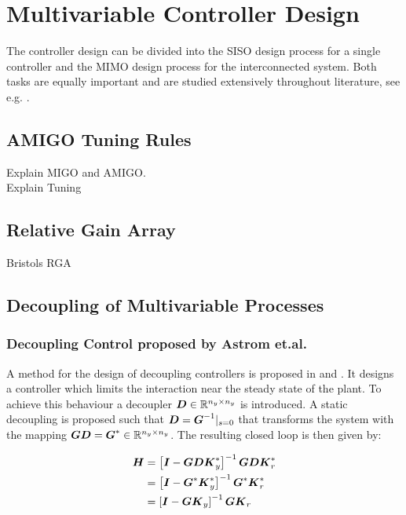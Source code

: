 \chapter{Multivariable Controller Design}%
\label{c:controller}

The controller design can be divided into the SISO design process for a single controller and the MIMO design process for the interconnected system. Both tasks are equally important and are studied extensively throughout literature, see e.g. \cite{Astrom2000a}.\\

\section{AMIGO Tuning Rules} %
\label{c:controller:s:AMIGO}

Explain MIGO and AMIGO.\\
Explain Tuning

\section{Relative Gain Array} %
\label{c:control:s:rga}

Bristols RGA

\section{Decoupling of Multivariable Processes} %
\label{c:controller:s:decoupling}

\subsection*{Decoupling Control proposed by Astrom et.al.}
A method for the design of decoupling controllers is proposed in \cite{Astrom2001a} and \cite{Astrom2006AdvancedControl}. It designs a controller which limits the interaction near the steady state of the plant. To achieve this behaviour a decoupler $\mbox{\boldmath$D$} \in  \mathbb{R}^{n_y \times n_y}$ is introduced. A static decoupling is proposed such that $\mbox{\boldmath$D$} = \mbox{\boldmath$G$}^{-1}|_{s=0}$ that transforms the system with the mapping $\mbox{\boldmath$G$} \mbox{\boldmath$D$} = \mbox{\boldmath$G$}^* \in \mathbb{R}^{n_y \times n_y}$. The resulting closed loop is then given by: 

\begin{align}
\begin{split}
\mbox{\boldmath$H$} &= \left[ \mbox{\boldmath$I$}  - \mbox{\boldmath$G$} \mbox{\boldmath$D$} \mbox{\boldmath$K$}_y^* \right]^{-1} \mbox{\boldmath$G$} \mbox{\boldmath$D$} \mbox{\boldmath$K$}_r^* \\
	 &= \left[ \mbox{\boldmath$I$}  - \mbox{\boldmath$G$}^* \mbox{\boldmath$K$}_y^* \right]^{-1} \mbox{\boldmath$G$}^* \mbox{\boldmath$K$}_r^* \\
     &= \left[ \mbox{\boldmath$I$}  - \mbox{\boldmath$G$} \mbox{\boldmath$K$}_y \right]^{-1} \mbox{\boldmath$G$} \mbox{\boldmath$K$}_r \\
\end{split}
\label{c:control:e:closedloopastrom}
\end{align}

